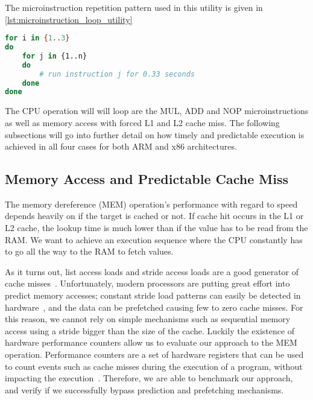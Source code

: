 The microinstruction repetition pattern used in this utility is given in \autoref{lst:microinstruction_loop_utility}

\begin{lstlisting}[language=BASH, caption={Mapping execution to the time domain: Microinstruction loop utility.}, label={lst:microinstruction_loop_utility}]
for i in {1..3}
do
	for j in {1..n}
	do
		# run instruction j for 0.33 seconds
	done
done
\end{lstlisting}

The CPU operation will will loop are the MUL, ADD and NOP microinstructions as well as memory access with forced L1 and L2 cache miss.
The following subsections will go into further detail on how timely and predictable execution is achieved in all four cases for both ARM and x86 architectures.


\subsection{Memory Access and Predictable Cache Miss}\label{chp4:subsec:MEM_operation}
The memory dereference (MEM) operation's performance with regard to speed depends heavily on if the target is cached or not. 
If cache hit occurs in the L1 or L2 cache, the lookup time is much lower than if the value has to be read from the RAM.
We want to achieve an execution sequence where the CPU constantly has to go all the way to the RAM to fetch values.

As it turns out, list access loads and stride access loads are a good generator of cache misses~\cite{DBLP:conf/micro/OzawaKN95}.
Unfortunately, modern processors are putting great effort into predict memory accesses; constant stride load patterns can easily be detected in hardware~\cite{DBLP:journals/taco/LeeKV12}, and the data can be prefetched causing few to zero cache misses.
For this reason, we cannot rely on simple mechanisms such as sequential memory access using a stride bigger than the size of the cache.
Luckily the existence of hardware performance counters allow us to evaluate our approach to the MEM operation. 
Performance counters are a set of hardware registers that can be used to count events such as cache misses during the execution of a program, without impacting the execution~\cite{url:perf_wiki}.
Therefore, we are able to benchmark our approach, and verify if we successfully bypass prediction and prefetching mechanisms.

